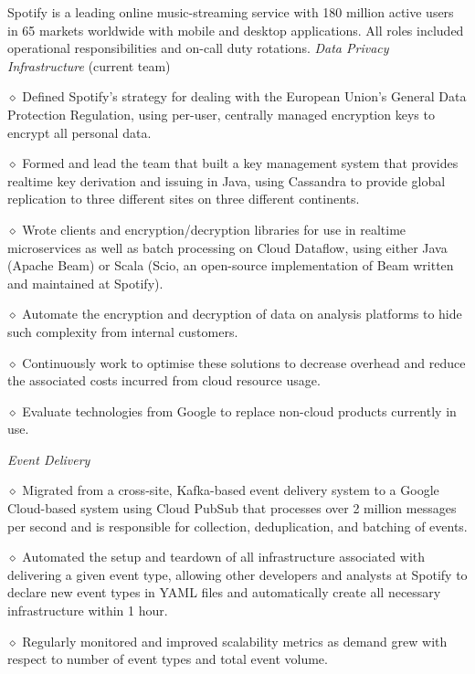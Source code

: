 \bigskip

\smallskip
Spotify is a leading online music-streaming service with 180 million active users in 65 markets 
worldwide with mobile and desktop applications. All roles included operational responsibilities and on-call duty rotations.
\smallskip
{\it Data Privacy Infrastructure} (current team)
\parindent=20pt
\item{$\diamond$} Defined Spotify's strategy for dealing with the European Union's General Data Protection Regulation, using per-user, centrally managed encryption keys to encrypt all personal data.
\item{$\diamond$} Formed and lead the team that built a key management system that provides realtime key derivation and issuing in Java, using Cassandra to provide global replication to three different sites on three different continents.
\item{$\diamond$} Wrote clients and encryption/decryption libraries for use in realtime microservices as well as batch processing on Cloud Dataflow, using either Java (Apache Beam) or Scala (Scio, an open-source implementation of Beam written and maintained at Spotify).
\item{$\diamond$} Automate the encryption and decryption of data on analysis platforms to hide such complexity from internal customers.
\item{$\diamond$} Continuously work to optimise these solutions to decrease overhead and reduce the associated costs incurred from cloud resource usage.
\item{$\diamond$} Evaluate technologies from Google to replace non-cloud products currently in use.
\parindent=0pt

{\it Event Delivery}
\parindent=20pt
\item{$\diamond$} Migrated from a cross-site, Kafka-based event delivery system to a Google Cloud-based system using Cloud PubSub that processes over 2 million messages per second and is responsible for collection, deduplication, and batching of events.
\item{$\diamond$} Automated the setup and teardown of all infrastructure associated with delivering a given event type, allowing other developers and analysts at Spotify to declare new event types in YAML files and automatically create all necessary infrastructure within 1 hour. 
\item{$\diamond$} Regularly monitored and improved scalability metrics as demand grew with respect to number of event types and total event volume.
\parindent=0pt

